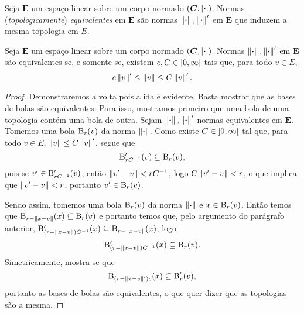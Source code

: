 \begin{definition}
Seja $\bm E$ um espaço linear sobre um corpo normado $(\bm C,\left\vert{\bm{\cdot}}\right\vert)$. Normas (\emph{topologicamente}) \emph{equivalentes} em $\bm E$ são normas $\left\Vert{\bm{\cdot}}\right\Vert, \left\Vert{\bm{\cdot}}\right\Vert'$ em $\bm E$ que induzem a mesma topologia em $E$.
\end{definition}

\begin{proposition}
Seja $\bm E$ um espaço linear sobre um corpo normado $(\bm C,\left\vert{\bm{\cdot}}\right\vert)$. Normas $\left\Vert{\bm{\cdot}}\right\Vert, \left\Vert{\bm{\cdot}}\right\Vert'$ em $\bm E$ são equivalentes se, e somente se, existem $c,C \in \left]{0},{\infty}\right[$ tais que, para todo $v \in E$,
	\begin{equation*}
	c \left\Vert{v}\right\Vert' \leq \left\Vert{v}\right\Vert \leq C \left\Vert{v}\right\Vert'.
	\end{equation*}
\end{proposition}
\begin{proof}
Demonstraremos a volta pois a ida é evidente.
Basta mostrar que as bases de bolas são equivalentes. Para isso, mostramos primeiro que uma bola de uma topologia contém uma bola de outra. Sejam $\left\Vert{\bm{\cdot}}\right\Vert, \left\Vert{\bm{\cdot}}\right\Vert'$ normas equivalentes em $\bm E$. Tomemos uma bola $\mathrm{B}_r(v)$ da norma $\left\Vert{\bm{\cdot}}\right\Vert$. Como existe $C \in \left]{0},{\infty}\right[$ tal que, para todo $v \in E$, $\left\Vert{v}\right\Vert \leq C \left\Vert{v}\right\Vert'$, segue que
	\begin{equation*}
	\mathrm{B}'_{rC^{-1}}(v) \subseteq \mathrm{B}_r(v),
	\end{equation*}
pois se $v' \in \mathrm{B}'_{rC^{-1}}(v)$, então $\left\Vert{v'-v}\right\Vert < rC^{-1}$, logo $C\left\Vert{v'-v}\right\Vert < r$, o que implica que $\left\Vert{v'-v}\right\Vert < r$, portanto $v' \in \mathrm{B}_r(v)$.

Sendo assim, tomemos uma bola $\mathrm{B}_r(v)$ da norma $\left\Vert{\bm{\cdot}}\right\Vert$ e $x \in \mathrm{B}_r(v)$. Então temos que $\mathrm{B}_{r-\left\Vert{x-v}\right\Vert}(x) \subseteq \mathrm{B}_r(v)$
e portanto temos que, pelo argumento do parágrafo anterior, $\mathrm{B}'_{(r-\left\Vert{x-v}\right\Vert)C^{-1}}(x) \subseteq \mathrm{B}_{r-\left\Vert{x-v}\right\Vert}(x)$, logo
	\begin{equation*}
	\mathrm{B}'_{(r-\left\Vert{x-v}\right\Vert)C^{-1}}(x) \subseteq \mathrm{B}_r(v).
	\end{equation*}
Simetricamente, mostra-se que
	\begin{equation*}
	\mathrm{B}_{(r-\left\Vert{x-v}\right\Vert')c}(x) \subseteq \mathrm{B}'_r(v),
	\end{equation*}
portanto as bases de bolas são equivalentes, o que quer dizer que as topologias são a mesma.
\end{proof}




